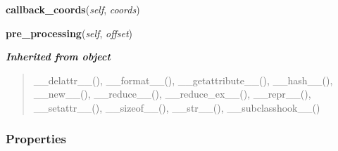     \label{osm2fbx:osm:module:DataProcessor:callback_coords}

    \vspace{0.5ex}

\hspace{.8\funcindent}\begin{boxedminipage}{\funcwidth}

    \raggedright \textbf{callback\_coords}(\textit{self}, \textit{coords})

\setlength{\parskip}{2ex}
\setlength{\parskip}{1ex}
    \end{boxedminipage}

    \label{osm2fbx:osm:module:DataProcessor:pre_processing}

    \vspace{0.5ex}

\hspace{.8\funcindent}\begin{boxedminipage}{\funcwidth}

    \raggedright \textbf{pre\_processing}(\textit{self}, \textit{offset})

\setlength{\parskip}{2ex}
\setlength{\parskip}{1ex}
    \end{boxedminipage}


\large{\textbf{\textit{Inherited from object}}}

\begin{quote}
\_\_delattr\_\_(), \_\_format\_\_(), \_\_getattribute\_\_(), \_\_hash\_\_(), \_\_new\_\_(), \_\_reduce\_\_(), \_\_reduce\_ex\_\_(), \_\_repr\_\_(), \_\_setattr\_\_(), \_\_sizeof\_\_(), \_\_str\_\_(), \_\_subclasshook\_\_()
\end{quote}


  \subsubsection{Properties}


